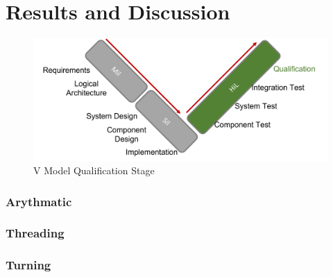 \chapter{Results and Discussion}
\label{resultanddiscussion}
\begin{figure}[h!]
    \begin{center}
    \includegraphics[width=12cm]{Pictures/V Model Qualification.png}
    \caption[V Model Qualification]{V Model Qualification Stage}
    \label{V Model Qualification}
    \end{center}
\end{figure}
\subsection{Arythmatic}
\subsection{Threading}
\subsection{Turning}